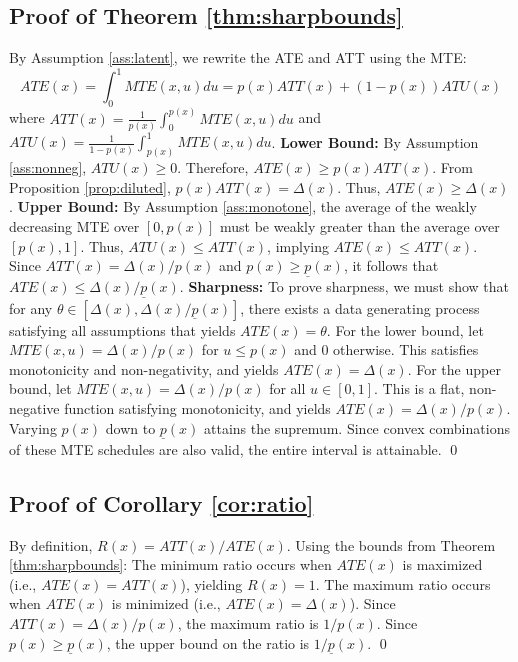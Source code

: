 \documentclass[11pt]{article}
\begin{document}
\subsection*{Proof of Theorem \ref{thm:sharpbounds}}
By Assumption \ref{ass:latent}, we rewrite the ATE and ATT using the MTE:
\[ ATE(x) = \int_0^1 MTE(x,u) du = p(x)ATT(x) + (1-p(x))ATU(x) \]
where $ATT(x) = \frac{1}{p(x)}\int_0^{p(x)} MTE(x,u) du$ and $ATU(x) = \frac{1}{1-p(x)}\int_{p(x)}^1 MTE(x,u) du$.
\newline
\textbf{Lower Bound:} By Assumption \ref{ass:nonneg}, $ATU(x) \ge 0$. Therefore, $ATE(x) \ge p(x)ATT(x)$. From Proposition \ref{prop:diluted}, $p(x)ATT(x) = \Delta(x)$. Thus, $ATE(x) \ge \Delta(x)$.
\newline
\textbf{Upper Bound:} By Assumption \ref{ass:monotone}, the average of the weakly decreasing MTE over $[0, p(x)]$ must be weakly greater than the average over $[p(x), 1]$. Thus, $ATU(x) \le ATT(x)$, implying $ATE(x) \le ATT(x)$. Since $ATT(x) = \Delta(x)/p(x)$ and $p(x) \ge \underline{p}(x)$, it follows that $ATE(x) \le \Delta(x)/\underline{p}(x)$.
\newline
\textbf{Sharpness:} To prove sharpness, we must show that for any $\theta \in [\Delta(x), \Delta(x)/\underline{p}(x)]$, there exists a data generating process satisfying all assumptions that yields $ATE(x) = \theta$. 
For the lower bound, let $MTE(x,u) = \Delta(x)/p(x)$ for $u \le p(x)$ and $0$ otherwise. This satisfies monotonicity and non-negativity, and yields $ATE(x) = \Delta(x)$.
For the upper bound, let $MTE(x,u) = \Delta(x)/p(x)$ for all $u \in [0,1]$. This is a flat, non-negative function satisfying monotonicity, and yields $ATE(x) = \Delta(x)/p(x)$. Varying $p(x)$ down to $\underline{p}(x)$ attains the supremum. Since convex combinations of these MTE schedules are also valid, the entire interval is attainable. \qed

\subsection*{Proof of Corollary \ref{cor:ratio}}
By definition, $R(x) = ATT(x)/ATE(x)$. 
Using the bounds from Theorem \ref{thm:sharpbounds}:
The minimum ratio occurs when $ATE(x)$ is maximized (i.e., $ATE(x) = ATT(x)$), yielding $R(x) = 1$.
The maximum ratio occurs when $ATE(x)$ is minimized (i.e., $ATE(x) = \Delta(x)$). Since $ATT(x) = \Delta(x)/p(x)$, the maximum ratio is $1/p(x)$. Since $p(x) \ge \underline{p}(x)$, the upper bound on the ratio is $1/\underline{p}(x)$. \qed
\end{document}
